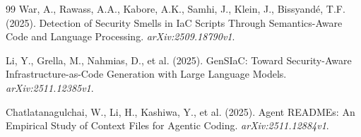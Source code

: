 \documentclass[11pt,a4paper]{article}
\begin{document}
\begin{thebibliography}{99}
War, A., Rawass, A.A., Kabore, A.K., Samhi, J., Klein, J., Bissyandé, T.F. (2025). Detection of Security Smells in IaC Scripts Through Semantics-Aware Code and Language Processing. \textit{arXiv:2509.18790v1}.

Li, Y., Grella, M., Nahmias, D., et al. (2025). GenSIaC: Toward Security-Aware Infrastructure-as-Code Generation with Large Language Models. \textit{arXiv:2511.12385v1}.

Chatlatanagulchai, W., Li, H., Kashiwa, Y., et al. (2025). Agent READMEs: An Empirical Study of Context Files for Agentic Coding. \textit{arXiv:2511.12884v1}.

\end{thebibliography}
\end{document}
